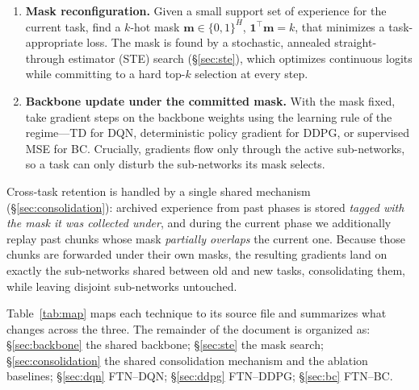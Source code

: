 \documentclass[11pt]{article}
\newcommand{\mask}{\bm{m}}                 %
\newcommand{\Ho}{H}                        %
\newcommand{\kk}{k}                        %
\begin{document}
\begin{enumerate}[leftmargin=2em,itemsep=2pt]
  \item \textbf{Mask reconfiguration.} Given a small support set of experience for
  the current task, find a $\kk$-hot mask $\mask \in \{0,1\}^{\Ho}$,
  $\bm{1}^\top\mask = \kk$, that minimizes a task-appropriate loss. The mask is
  found by a stochastic, annealed straight-through estimator (STE) search
  (\S\ref{sec:ste}), which optimizes continuous logits while committing to a hard
  top-$k$ selection at every step.
  \item \textbf{Backbone update under the committed mask.} With the mask fixed,
  take gradient steps on the backbone weights using the learning rule of the
  regime---TD for DQN, deterministic policy gradient for DDPG, or supervised MSE
  for BC. Crucially, gradients flow only through the active sub-networks, so a
  task can only disturb the sub-networks its mask selects.
\end{enumerate}

Cross-task retention is handled by a single shared mechanism
(\S\ref{sec:consolidation}): archived experience from past phases is stored
\emph{tagged with the mask it was collected under}, and during the current phase
we additionally replay past chunks whose mask \emph{partially overlaps} the
current one. Because those chunks are forwarded under their own masks, the
resulting gradients land on exactly the sub-networks shared between old and new
tasks, consolidating them, while leaving disjoint sub-networks untouched.

Table~\ref{tab:map} maps each technique to its source file and summarizes what
changes across the three. The remainder of the document is organized as:
\S\ref{sec:backbone} the shared backbone; \S\ref{sec:ste} the mask search;
\S\ref{sec:consolidation} the shared consolidation mechanism and the ablation
baselines; \S\ref{sec:dqn} FTN--DQN; \S\ref{sec:ddpg} FTN--DDPG; \S\ref{sec:bc}
FTN--BC.
\end{document}
